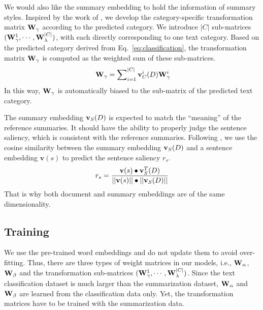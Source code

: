 \documentclass[letterpaper]{article}
\begin{document}
We would also like the summary embedding to hold the information of summary styles.
Inspired by the work of \cite{dong2014adaptive}, we develop the category-specific transformation matrix ${\bf{W}}_\gamma$ according to the predicted category.
We introduce $|C|$ sub-matrices $({\bf{W}}_\gamma ^1, \cdots ,{\bf{W}}_\lambda ^{|C|})$, with each directly corresponding to one text category.
Based on the predicted category derived from Eq.~\ref{eq:classification}, the transformation matrix ${\bf{W}}_\gamma$ is computed as the weighted sum of these sub-matrices.
\begin{equation}~\label{eq:adaptive}
{{\bf{W}}_\gamma } = \sum\nolimits_{i = 1}^{|C|} {{\bf{v}}_C^i(D)} {\bf{W}}_\gamma ^i
\end{equation}
In this way, ${{\bf{W}}_\gamma }$ is automatically biased to the sub-matrix of the predicted text category.

The summary embedding ${\bf{v}}_S(D)$ is expected to match the ``meaning'' of the reference summaries.
It should have the ability to properly judge the sentence saliency, which is consistent with the reference summaries.
Following \cite{kobayashi-noguchi-yatsuka:2015:EMNLP}, we use the cosine similarity between the summary embedding ${\bf{v}}_S(D)$ and a sentence embedding ${\mathbf{v}}(s)$ to predict the sentence saliency $r_s$.
\begin{equation} \label{EQ:similarity}
r_s= \frac{{{\bf{v}}(s) \bullet {\bf{v}}_S^T(D)}}{{||{\bf{v}}(s)|| \bullet ||{{\bf{v}}_S}(D)||}}
\end{equation}
That is why both document and summary embeddings are of the same dimensionality.

\subsection{Training}\label{SC:training}
We use the pre-trained word embeddings and do not update them to avoid over-fitting.
Thus, there are three types of weight matrices in our models, i.e., ${{\bf{W}}_\alpha }$, ${{\bf{W}}_\beta }$ and the transformation sub-matrices $({\bf{W}}_\gamma ^1, \cdots ,{\bf{W}}_\lambda ^{|C|})$.
Since the text classification dataset is much larger than the summarization dataset, ${{\bf{W}}_\alpha }$ and ${{\bf{W}}_\beta }$ are learned from the classification data only.
Yet, the transformation matrices have to be trained with the summarization data.
\end{document}

